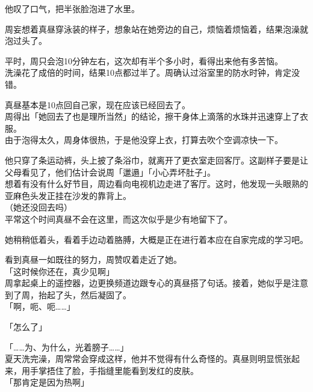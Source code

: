 他叹了口气，把半张脸泡进了水里。\\

\vspace{2\baselineskip}

周妄想着真昼穿泳装的样子，想象站在她旁边的自己，烦恼着烦恼着，结果泡澡就泡过头了。

平时，周只会泡10分钟左右，这次却有半个多小时，看得出来他有多苦恼。\\

洗澡花了成倍的时间，结果10点都过半了。周确认过浴室里的防水时钟，肯定没错。

真昼基本是10点回自己家，现在应该已经回去了。\\

周得出「她回去了也是理所当然」的结论，擦干身体上滴落的水珠并迅速穿上了衣服。\\

由于泡得太久，周身体很热，于是他没穿上衣，打算去吹个空调凉快一下。

他只穿了条运动裤，头上披了条浴巾，就离开了更衣室走回客厅。这副样子要是让父母看见了，他们估计会说周「邋遢」「小心弄坏肚子」。\\

想着有没有什么好节目，周边看向电视机边走进了客厅。这时，他发现一头眼熟的亚麻色头发正挂在沙发的靠背上。\\

（她还没回去吗）\\

平常这个时间真昼不会在这里，而这次似乎是少有地留下了。

她稍稍低着头，看着手边动着胳膊，大概是正在进行着本应在自家完成的学习吧。

看到真昼一如既往的努力，周赞叹着走近了她。\\

「这时候你还在，真少见啊」\\

周拿起桌上的遥控器，边更换频道边跟专心的真昼搭了句话。接着，她似乎是注意到了周，抬起了头，然后凝固了。\\

「啊，呃、呃……」

「怎么了」

「……为、为什么，光着膀子……」\\

夏天洗完澡，周常常会穿成这样，他并不觉得有什么奇怪的。真昼则明显慌张起来，用手掌捂住了脸，手指缝里能看到发红的皮肤。\\

「那肯定是因为热啊」

